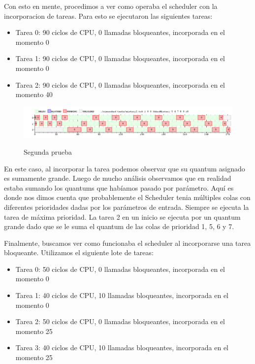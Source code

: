 \pagebreak

Con esto en mente, procedimos a ver como operaba el scheduler con la incorporacion de tareas. Para esto se ejecutaron las siguientes tareas:

\begin{itemize}
	\item Tarea 0: 90 ciclos de CPU, 0 llamadas bloqueantes, incorporada en el momento 0
	\item Tarea 1: 90 ciclos de CPU, 0 llamadas bloqueantes, incorporada en el momento 0
	\item Tarea 2: 90 ciclos de CPU, 0 llamadas bloqueantes, incorporada en el momento 40
\end{itemize}

\begin{figure}[h]
    \includegraphics[width=\linewidth]{images/mist2.png}
    \label{fig:Task Consola}
    \caption{Segunda prueba}
\end{figure}

En este caso, al incorporar la tarea podemos observar que su quantum asignado es sumamente grande. Luego de mucho análisis observamos que en realidad estaba sumando los quantums que habíamos pasado por parámetro. Aquí es donde nos dimos cuenta que probablemente el Scheduler tenia múltiples colas con diferentes prioridades dadas por los parámetros de entrada. Siempre se ejecuta la tarea de máxima prioridad. La tarea 2 en un inicio se ejecuta por un quantum grande dado que se le suma el quantum de las colas de prioridad 1, 5, 6 y 7.

\hspace{1px}

Finalmente, buscamos ver como funcionaba el scheduler al incorporarse una tarea bloqueante. Utilizamos el siguiente lote de tareas:

\begin{itemize}
	\item Tarea 0: 50 ciclos de CPU, 0 llamadas bloqueantes, incorporada en el momento 0
	\item Tarea 1: 40 ciclos de CPU, 10 llamadas bloqueantes, incorporada en el momento 0
	\item Tarea 2: 50 ciclos de CPU, 0 llamadas bloqueantes, incorporada en el momento 25
	\item Tarea 3: 40 ciclos de CPU, 10 llamadas bloqueantes, incorporada en el momento 25
\end{itemize}


